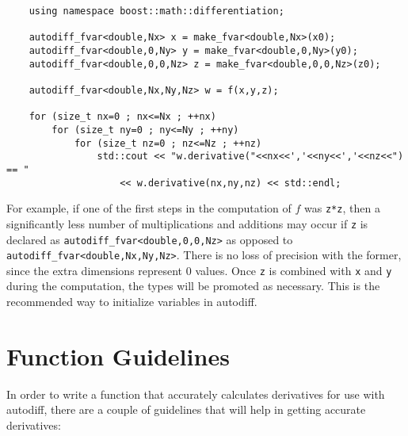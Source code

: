\documentclass{article}
\begin{document}
\begin{verbatim}
    using namespace boost::math::differentiation;

    autodiff_fvar<double,Nx> x = make_fvar<double,Nx>(x0);
    autodiff_fvar<double,0,Ny> y = make_fvar<double,0,Ny>(y0);
    autodiff_fvar<double,0,0,Nz> z = make_fvar<double,0,0,Nz>(z0);

    autodiff_fvar<double,Nx,Ny,Nz> w = f(x,y,z);

    for (size_t nx=0 ; nx<=Nx ; ++nx)
        for (size_t ny=0 ; ny<=Ny ; ++ny)
            for (size_t nz=0 ; nz<=Nz ; ++nz)
                std::cout << "w.derivative("<<nx<<','<<ny<<','<<nz<<") == "
                    << w.derivative(nx,ny,nz) << std::endl;
\end{verbatim}
For example, if one of the first steps in the computation of $f$ was {\tt z*z}, then a significantly less number of
multiplications and additions may occur if {\tt z} is declared as {\tt autodiff\_fvar<double,0,0,Nz>} as opposed to \\
{\tt autodiff\_fvar<double,Nx,Ny,Nz>}. There is no loss of precision with the former, since the extra dimensions
represent 0 values. Once {\tt z} is combined with {\tt x} and {\tt y} during the computation, the types will be
promoted as necessary.  This is the recommended way to initialize variables in autodiff.

\section{Function Guidelines}

In order to write a function that accurately calculates derivatives for use with autodiff, there are a couple
of guidelines that will help in getting accurate derivatives:
\end{document}
